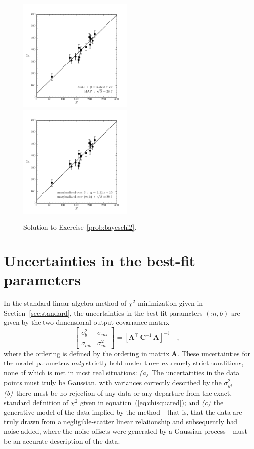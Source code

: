 \documentclass[12pt,twoside]{article}
\newcommand{\sectionname}{Section}
\newcommand{\equationname}{equation}
\newcommand{\problemname}{Exercise}
\newcounter{problem}
\newcommand{\mmatrix}[1]{\boldsymbol{#1}}
\newcommand{\inverse}[1]{{#1}^{-1}}
\newcommand{\transpose}[1]{{#1}^{\scriptscriptstyle \top}}
\newcommand{\mA}{\mmatrix{A}}
\newcommand{\mAT}{\transpose{\mA}}
\newcommand{\mC}{\mmatrix{C}}
\newcommand{\mCinv}{\inverse{\mC}}
\begin{document}
\begin{figure}[htb]
\includegraphics[width=0.5\textwidth]{ex10a.png}
\includegraphics[width=0.5\textwidth]{ex10b.png}
\caption{Solution to \problemname~\ref{prob:bayeschi2}.}\label{fig:bayeschi2}
\end{figure}

\section{Uncertainties in the best-fit parameters}\label{sec:uncertainty}

In the standard linear-algebra method of $\chi^2$ minimization given
in \sectionname~\ref{sec:standard}, the uncertainties in the best-fit
parameters $(m,b)$ are given by the two-dimensional output covariance
matrix
\begin{equation}
\left[\begin{array}{cc}
\sigma_{b}^2 & \sigma_{mb} \\
\sigma_{mb} & \sigma_{m}^2
\end{array}\right] = \inverse{\left[\mAT\,\mCinv\,\mA\right]} \quad ,
\end{equation}
where the ordering is defined by the ordering in matrix $\mA$.  These
uncertainties for the model parameters \emph{only} strictly hold under
three extremely strict conditions, none of which is met in most real
situations: \textsl{(a)}~The uncertainties in the data points must
truly be Gaussian, with variances correctly described by the
$\sigma_{yi}^2$; \textsl{(b)}~there must be no rejection of any data
or any departure from the exact, standard definition of $\chi^2$ given
in \equationname~(\ref{eq:chisquared}); and \textsl{(c)}~the
generative model of the data implied by the method---that is, that the
data are truly drawn from a negligible-scatter linear relationship and
subsequently had noise added, where the noise offsets were generated
by a Gaussian process---must be an accurate description of the data.
\end{document}
